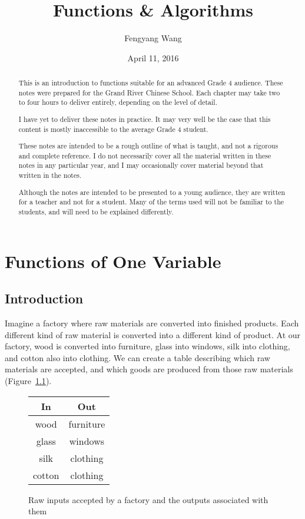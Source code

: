 \documentclass[a4paper,10pt]{report}
\title{Functions \& Algorithms}
\author{Fengyang Wang}
\date{April 11, 2016}
\begin{document}
\begin{abstract}

This is an introduction to functions suitable for an advanced Grade 4 audience.
These notes were prepared for the Grand River Chinese School. Each chapter may
take two to four hours to deliver entirely, depending on the level of detail.

I have yet to deliver these notes in practice. It may very well be the case
that this content is mostly inaccessible to the average Grade 4 student.

These notes are intended to be a rough outline of what is taught, and not a
rigorous and complete reference. I do not necessarily cover all the material
written in these notes in any particular year, and I may occasionally cover
material beyond that written in the notes.

Although the notes are intended to be presented to a young audience, they are
written for a teacher and not for a student. Many of the terms used will not be
familiar to the students, and will need to be explained differently.

\end{abstract}

\maketitle

\tableofcontents

\chapter{Functions of One Variable}

\section{Introduction}

Imagine a factory where raw materials are converted into finished products.
Each different kind of raw material is converted into a different kind of
product. At our factory, wood is converted into furniture, glass into windows,
silk into clothing, and cotton also into clothing. We can create a table
describing which raw materials are accepted, and which goods are produced from
those raw materials (Figure~\ref{fov:factory}).

\begin{figure}
 \renewcommand{\arraystretch}{1.2}
 \begin{tabular}{|c|c|}
  \hline
  \textbf{In} & \textbf{Out} \\
  \hline
  wood & furniture \\
  glass & windows \\
  silk & clothing \\
  cotton & clothing \\
  \hline
 \end{tabular}

 \caption{Raw inputs accepted by a factory and the outputs associated with
 them}
 \label{fov:factory}
\end{figure}
\end{document}
